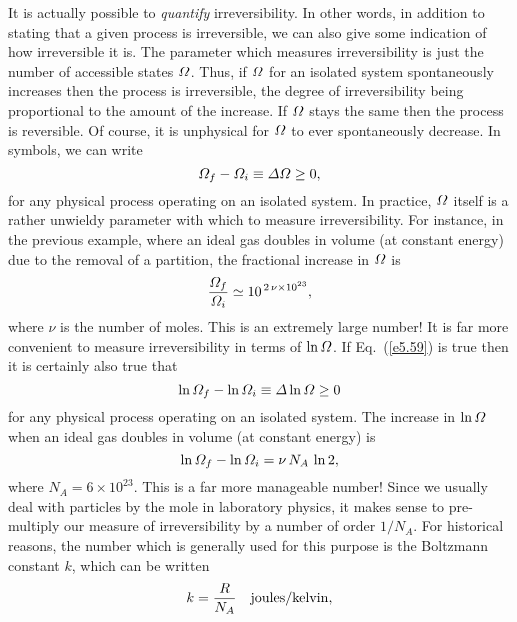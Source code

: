 It is actually possible to {\em quantify}\/ irreversibility. 
In other words, in  addition to
stating  that
a given process is irreversible, we can also  give some indication
of how irreversible it is. The parameter which measures irreversibility is
just  the number of accessible states ${\mit\Omega}$.
 Thus, if ${\mit\Omega}$ for an isolated
system spontaneously
increases then the process is irreversible, the degree of irreversibility
being proportional to the amount of
the increase. If ${\mit\Omega}$ stays the same then the process
is reversible. Of course, it is unphysical for ${\mit\Omega}$ to ever spontaneously
decrease. In symbols, we can write
\begin{equation}
{\mit\Omega}_f -{\mit\Omega}_i \equiv {\mit\Delta} {\mit\Omega}\geq 0,\label{e5.59}
\end{equation}
for any physical process operating on an isolated system.
In practice, ${\mit\Omega}$ itself is a rather unwieldy parameter
with which  to measure 
irreversibility. For instance, in the previous
example, where an ideal gas doubles in 
volume (at constant energy)
due to  the removal of a partition, the fractional increase in ${\mit\Omega}$
is
\begin{equation}
\frac{{\mit\Omega}_f}{{\mit\Omega}_i} \simeq 10^{\,2\,\nu\times 10^{23}},
\end{equation}
where $\nu$ is the number of moles. This is an extremely large number!
It is far more convenient to measure irreversibility in terms of $\ln {\mit\Omega}$.
If Eq.~(\ref{e5.59}) is true  then it is certainly also true that
\begin{equation}\label{e5.61}
\ln {\mit\Omega}_f -\ln {\mit\Omega}_i \equiv {\mit\Delta} \ln{\mit\Omega}\geq 0
\end{equation}
for any physical process operating on an isolated system. 
The increase in $\ln {\mit\Omega}$ when an ideal gas doubles
in volume (at constant energy) is
\begin{equation}
\ln {\mit\Omega}_f - \ln {\mit\Omega}_i = \nu\, N_A\,\ln 2,
\end{equation}
where $N_A=6\times 10^{23}$. This is a far more manageable
number! Since we usually  deal with particles by the mole in laboratory
physics, it makes sense to pre-multiply our measure of irreversibility by a
number of order $1/N_A$. For historical reasons, the number which is
generally used for this purpose is the Boltzmann constant $k$, which can be written
\begin{equation}
k = \frac{R}{N_A} ~~~{\rm joules/kelvin},
\end{equation}
